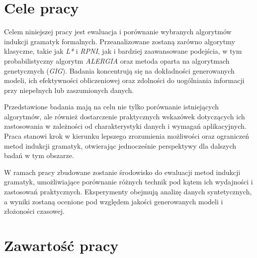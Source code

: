 
\section{Cele pracy}
\label{sec:celePracy}


Celem niniejszej pracy jest ewaluacja i porównanie wybranych algorytmów indukcji gramatyk formalnych. Przeanalizowane zostaną zarówno algorytmy klasyczne, takie jak \textit{L*} i \textit{RPNI}, jak i bardziej zaawansowane podejścia, w tym probabilistyczny algorytm \textit{ALERGIA} oraz metoda oparta na algorytmach genetycznych (\textit{GIG}). Badania koncentrują się na dokładności generowanych modeli, ich efektywności obliczeniowej oraz zdolności do uogólniania informacji przy niepełnych lub zaszumionych danych.

Przedstawione badania mają na celu nie tylko porównanie istniejących algorytmów, ale również dostarczenie praktycznych wskazówek dotyczących ich zastosowania w zależności od charakterystyki danych i wymagań aplikacyjnych. Praca stanowi krok w kierunku lepszego zrozumienia możliwości oraz ograniczeń metod indukcji gramatyk, otwierając jednocześnie perspektywy dla dalszych badań w tym obszarze.  

W ramach pracy zbudowane zostanie środowisko do ewaluacji metod indukcji gramatyk, umożliwiające porównanie różnych technik pod kątem ich wydajności i zastosowań praktycznych. Eksperymenty obejmują analizę danych syntetycznych, a wyniki zostaną ocenione pod względem jakości generowanych modeli i złożoności czasowej. 


\section{Zawartość pracy}
\label{sec:zawartoscPracy}


